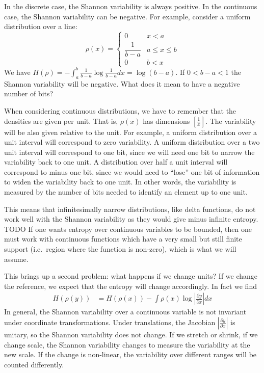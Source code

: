 \documentclass[iopart]{revtex4-1}
\begin{document}
In the discrete case, the Shannon variability is always positive. In the continuous case, the Shannon variability can be negative. For example, consider a uniform distribution over a line:
\begin{equation}
\rho(x)=
\begin{cases}
0 & x < a\\
\dfrac{1}{b-a} & a \leq x \leq b\\
0 & b < x
\end{cases}
\end{equation}
We have $H(\rho) = - \int_a^b \frac{1}{b-a} \log \frac{1}{b-a} dx = \log (b-a)$. If $0 < b-a < 1$ the Shannon variability will be negative. What does it mean to have a negative number of bits?

When considering continuous distributions, we have to remember that the densities are given per unit. That is, $\rho(x)$ has dimensions $[\frac{1}{x}]$. The variability will be also given relative to the unit. For example, a uniform distribution over a unit interval will correspond to zero variability. A uniform distribution over a two unit interval will correspond to one bit, since we will need one bit to narrow the variability back to one unit. A distribution over half a unit interval will correspond to minus one bit, since we would need to ``lose'' one bit of information to widen the variability back to one unit. In other words, the variability is measured by the number of bits needed to identify an element up to one unit.

This means that infinitesimally narrow distributions, like delta functions, do not work well with the Shannon variability as they would give minus infinite entropy. TODO If one wants entropy over continuous variables to be bounded, then one must work with continuous functions which have a very small but still finite support (i.e.~region where the function is non-zero), which is what we will assume.

This brings up a second problem: what happens if we change units? If we change the reference, we expect that the entropy will change accordingly. In fact we find
\begin{equation}
\begin{aligned}
H(\rho(y)) &= H(\rho(x)) - \int \rho(x)  \log \left|\frac{\partial y}{\partial x}\right|  dx 
\end{aligned}
\end{equation}
In general, the Shannon variability over a continuous variable is not invariant under coordinate transformations. Under translations, the Jacobian $\left|\frac{\partial y}{\partial x}\right|$ is unitary, so the Shannon variability does not change. If we stretch or shrink, if we change scale, the Shannon variability changes to measure the variability at the new scale. If the change is non-linear, the variability over different ranges will be counted differently.
\end{document}
